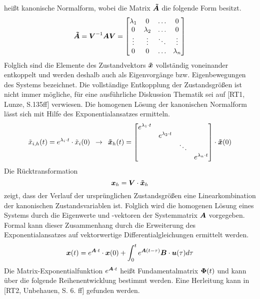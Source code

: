 heißt kanonische Normalform, wobei die Matrix $\boldsymbol{\tilde{A}}$ die folgende Form besitzt.
\begin{equation}
\boldsymbol{\tilde{A}} = \boldsymbol{V}^{-1}\boldsymbol{A}\boldsymbol{V} = \begin{bmatrix}
\lambda_1 & 0 & \hdots & 0 \\
0 & \lambda_2 & \hdots & 0 \\
\vdots & \vdots & \ddots & \vdots \\
0 & 0 & \hdots & \lambda_n
\end{bmatrix}
\end{equation}
Folglich sind die Elemente des Zustandvektors $\boldsymbol{\tilde{x}}$ vollständig voneinander entkoppelt und werden deshalb auch als Eigenvorgänge bzw. Eigenbewegungen des Systems bezeichnet. Die vollständige Entkopplung der Zustandsgrößen ist nicht immer mögliche, für eine ausführliche Diskussion Thematik sei auf [RT1, Lunze, S.135ff] verwiesen.
Die homogenen Lösung der kanonischen Normalform lässt sich mit Hilfe des Exponentialansatzes ermitteln.
\begin{equation}
\tilde{x}_{i,h}(t) = e^{\lambda_i\cdot t}\cdot \tilde{x}_i(0) \hspace{5pt}\rightarrow\hspace{5pt} \boldsymbol{\tilde{x}}_h(t) = \begin{bmatrix}
e^{\lambda_1\cdot t} &  & \\
& e^{\lambda_2\cdot t}  & \\
&  & \ddots & \\
&  & & e^{\lambda_n\cdot t}
\end{bmatrix}\cdot \boldsymbol{\tilde{x}}(0)
\end{equation}
Die Rücktransformation
\begin{equation}
\boldsymbol{x}_h = \boldsymbol{V}\cdot \boldsymbol{\tilde{x}}_h
\end{equation}
zeigt, dass der Verlauf der ursprünglichen Zustandsgrößen eine Linearkombination der kanonischen Zustandsvariablen ist. Folglich wird die homogenen Lösung eines Systems durch die Eigenwerte und -vektoren der Systemmatrix $\boldsymbol{A}$ vorgegeben. 
Formal kann dieser Zusammenhang durch die Erweiterung des Exponentialansatzes auf vektorwertige Differentialgleichungen ermittelt werden.
\begin{equation}
\boldsymbol{x}(t) = e^{\boldsymbol{A}\cdot t}\cdot \boldsymbol{x}(0) + \int^t_0 e^{\boldsymbol{A}(t-\tau)}\boldsymbol{B}\cdot \boldsymbol{u}(\tau)d\tau
\label{eq_fMat_zeitbereich}
\end{equation}
Die Matrix-Exponentialfunktion $e^{\boldsymbol{A}\cdot t}$ heißt Fundamentalmatrix $\boldsymbol{\Phi}(t)$ und kann über die folgende Reihenentwicklung bestimmt werden. Eine Herleitung kann in [RT2, Unbehauen, S. 6. ff] gefunden werden. 
